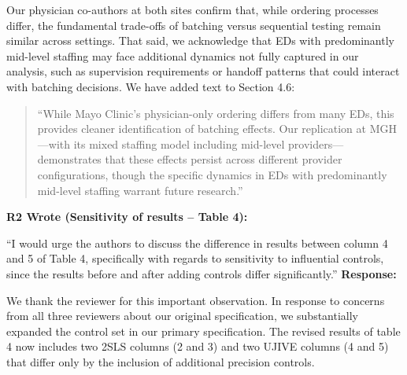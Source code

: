 \documentclass[11pt]{article}
\newenvironment{quote2}
{ \bigskip
\noindent
         \small\em
         \baselineskip=14pt
}
\newcommand{\1}{\hbox{\rm 1\kern-.35em 1}}
\begin{document}
Our physician co-authors at both sites confirm that, while ordering processes differ, the fundamental trade-offs of batching versus sequential testing remain similar across settings. That said, we acknowledge that EDs with predominantly mid-level staffing may face additional dynamics not fully captured in our analysis, such as supervision requirements or handoff patterns that could interact with batching decisions. We have added text to Section 4.6:

\begin{quote}
``While Mayo Clinic's physician-only ordering differs from many EDs, this provides cleaner identification of batching effects. Our replication at MGH—with its mixed staffing model including mid-level providers—demonstrates that these effects persist across different provider configurations, though the specific dynamics in EDs with predominantly mid-level staffing warrant future research.''
\end{quote}
\color{black}


\begin{quote2}
\textbf{R2 Wrote (Sensitivity of results – Table 4):}  

\noindent``I would urge the authors to discuss the difference in results between column 4 and 5 of Table 4, specifically with regards to sensitivity to influential controls, since the results before and after adding controls differ significantly.''
\end{quote2}

\noindent\textbf{Response:}\color{blue}

We thank the reviewer for this important observation. In response to concerns from all three reviewers about our original specification, we substantially expanded the control set in our primary specification. The revised results of table 4 now includes two 2SLS columns (2 and 3) and two UJIVE columns (4 and 5) that differ only by the inclusion of additional precision controls.
\end{document}
